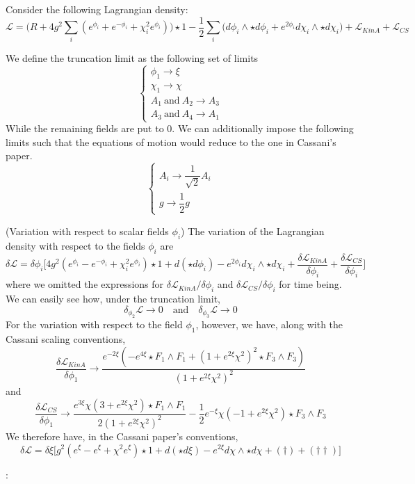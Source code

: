 
\usepackage{cancel}

\title{}
\author{Dane Jeon}
\abstract{}



\begin{defi}
Consider the following Lagrangian density:
\[\mathcal{L}= \Big(R+4g^2\sum _{i}(e^{\phi_{i}}+e^{-\phi _{i}}+\chi_{i}^2e^{\phi_{i}})\Big)\star1-\dfrac{1}{2}\sum _{i}\Big(d\phi _{i}\wedge \star d\phi_{i}+e^{2\phi_{i}}d\chi_{i}\wedge \star d\chi_{i}\Big)+\mathcal{L}_{KinA}+\mathcal{L}_{CS}\]
\end{defi}
\vspace{2ex}
\begin{defi}
We define the truncation limit as the following set of limits
\[\begin{cases}
\phi_1\rightarrow\xi\\ \chi_1\rightarrow \chi\\ A_1\ \mathrm{and}\ A_2\rightarrow A_3\\   A_3 \ \mathrm{and}\ A_4\rightarrow A_1 
\end{cases}\]
While the remaining fields are put to $0$. We can additionally impose the following limits such that the equations of motion would reduce to the one in Cassani's paper. 
\[\begin{cases}
A_{i}\rightarrow \dfrac{1}{\sqrt{2}}A_{i}\\
g\rightarrow \dfrac{1}{2}g 
\end{cases}\]
\end{defi}
\vspace{2ex}
\begin{prop}
(Variation with respect to scalar fields $\phi_i$) The variation of the Lagrangian density with respect to the fields $\phi_{i}$ are 
\[\delta \mathcal{L}=\delta \phi_i\Big[4g^2(e^{\phi_i}-e^{-\phi_i}+\chi_{i}^2e^{\phi _{i}})\star 1+d(\star d\phi_i)-e^{2\phi_i}d\chi_i\wedge\star d\chi_i+\dfrac{\delta \mathcal{L}_{KinA}}{\delta \phi_i}+\dfrac{\delta \mathcal{L}_{CS}}{\delta \phi_i}\Big]\]
where we omitted the expressions for $\delta \mathcal{L}_{KinA}/\delta \phi _{i}$ and $\delta \mathcal{L}_{CS}/\delta \phi _{i}$ for time being.  We can easily see how, under the truncation limit,
\[\delta_{\phi_2}\mathcal{L}\rightarrow 0\quad\mathrm{and}\quad \delta _{\phi_3}\mathcal{L}\rightarrow 0\]
For the variation with respect to the field $\phi_1$, however, we have, along with the Cassani scaling conventions,
\[\dfrac{\delta \mathcal{L}_{KinA}}{\delta \phi_1}\rightarrow \dfrac{e^{-2\xi }(-e^{4\xi }\star F_1\wedge F_1+(1+e^{2\xi }\chi ^2)^2\star F_3\wedge F_3)}{(1+e^{2\xi }\chi ^2)^2} \tag{\dagger}\]
and
\[\dfrac{\delta \mathcal{L}_{CS}}{\delta \phi_1}\rightarrow \dfrac{e^{3\xi }\chi (3+e^{2\xi }\chi ^2)\star F_1\wedge F_1}{2(1+e^{2\xi }\chi ^2)^2}-\dfrac{1}{2}e^{-\xi }\chi (-1+e^{2\xi }\chi ^2)\star F_3\wedge F_3\tag{\dagger\dagger}\]
We therefore have, in the Cassani paper's conventions,
\[\delta \mathcal{L}=\delta \xi \Big[g^2(e^{\xi }-e^{\xi  }+\chi ^2e^{\xi })\star 1+d(\star d\xi )-e^{2\xi }d\chi \wedge \star d\chi +(\dagger)+(\dagger\dagger)\Big]\]

\end{prop}
\vspace{2ex}

:
